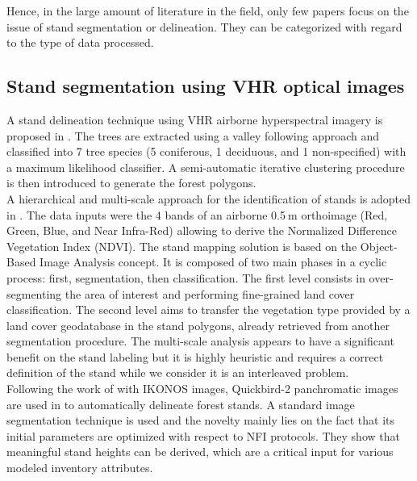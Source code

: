 Hence, in the large amount of literature in the field, only few papers focus on the issue of stand segmentation or delineation. They can be categorized with regard to the type of data processed. \\
\subsection{Stand segmentation using VHR optical images}
A stand delineation technique using VHR airborne hyperspectral imagery is proposed in \citep{leckie2003stand}. The trees are extracted using a valley following approach and classified into 7 tree species (5 coniferous, 1 deciduous, and 1 non-specified) with a maximum likelihood classifier. A semi-automatic iterative clustering procedure is then introduced to generate the forest polygons.\\
A hierarchical and multi-scale approach for the identification of stands is adopted in \citep{hernando2012spatial}. The data inputs were the 4 bands of an airborne 0.5$\:$m orthoimage (Red, Green, Blue, and Near Infra-Red) allowing to derive the Normalized Difference Vegetation Index (NDVI). The stand mapping solution is based on the Object-Based Image Analysis concept. It is composed of two main phases in a cyclic process: first, segmentation, then classification. The first level consists in over-segmenting the area of interest and performing fine-grained land cover classification. The second level aims to transfer the vegetation type provided by a land cover geodatabase in the stand polygons, already retrieved from another segmentation procedure. The multi-scale analysis appears to have a significant benefit on the stand labeling but it is highly heuristic and requires a correct definition of the stand while we consider it is an interleaved problem. \\
Following the work of \citep{Wulder2008} with IKONOS images, Quickbird-2 panchromatic images are used in \citep{Mora20102474} to automatically delineate forest stands. A standard image segmentation technique is used and the novelty mainly lies on the fact that its initial parameters are optimized with respect to NFI protocols. They show that meaningful stand heights can be derived, which are a critical input for various modeled inventory attributes.\\

